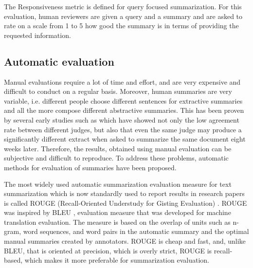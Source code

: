 \documentclass[11pt,a4paper,onecolumn]{article}
\begin{document}
The Responsiveness metric is defined for query focused summarization.
For this evaluation, human reviewers are given a query and a summary and are asked to rate on a scale from 1 to 5 how good the summary is in terms of providing the requested information.

\subsection{Automatic evaluation} \label{automatic_evaluation}
Manual evaluations require a lot of time and effort, and are very expensive and difficult to conduct on a regular basis.
Moreover, human summaries are very variable, i.e. different people choose different sentences for extractive summaries and all the more compose different abstractive summaries.
This has been proven by several early studies such as \cite{rath1961formation} which have showed not only the low agreement rate between different judges, but also that even the same judge may produce a significantly different extract when asked to summarize the same document eight weeks later.
Therefore, the results, obtained using manual evaluation can be subjective and difficult to reproduce.
To address these problems, automatic methods for evaluation of summaries have been proposed.

The most widely used automatic summarization evaluation measure for text summarization which is now standardly used to report results in research papers is called ROUGE (Recall-Oriented Understudy for Gisting Evaluation) \cite{lin2004rouge}.
ROUGE was inspired by BLEU \cite{papineni2002bleu}, evaluation measure that was developed for machine translation evaluation.
The measure is based on the overlap of units such as n-gram, word sequences, and word pairs in the automatic summary and the optimal manual summaries created by annotators.
ROUGE is cheap and fast, and, unlike BLEU, that is oriented at precision, which is overly strict, ROUGE is recall-based, which makes it more preferable for summarization evaluation.
\end{document}
